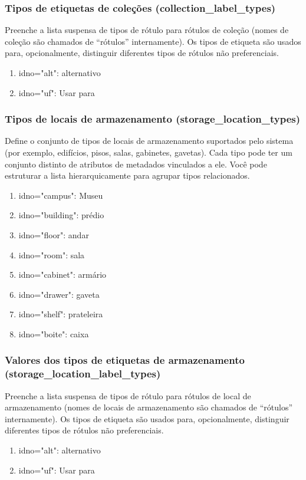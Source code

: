 \subsubsection{Tipos de etiquetas de coleções (collection\_label\_types)}
Preenche a lista suspensa de tipos de rótulo para rótulos de coleção (nomes de coleção são chamados de ``rótulos'' internamente). Os tipos de etiqueta são usados para, opcionalmente, distinguir diferentes tipos de rótulos não preferenciais.
\begin{enumerate}
	\item idno="alt": alternativo
	\item idno="uf": Usar para
\end{enumerate}

\subsubsection{Tipos de locais de armazenamento (storage\_location\_types)}
Define o conjunto de tipos de locais de armazenamento suportados pelo sistema (por exemplo, edifícios, pisos, salas, gabinetes, gavetas). Cada tipo pode ter um conjunto distinto de atributos de metadados vinculados a ele. Você pode estruturar a lista hierarquicamente para agrupar tipos relacionados.
\begin{enumerate}
	\item idno="campus": Museu
	\item idno="building": prédio
	\item idno="floor": andar
	\item idno="room": sala
	\item idno="cabinet": armário
	\item idno="drawer": gaveta
	\item idno="shelf": prateleira
	\item idno="boite": caixa
\end{enumerate}

\subsubsection{Valores dos tipos de etiquetas de armazenamento (storage\_location\_label\_types)}
Preenche a lista suspensa de tipos de rótulo para rótulos de local de armazenamento (nomes de locais de armazenamento são chamados de ``rótulos'' internamente). Os tipos de etiqueta são usados para, opcionalmente, distinguir diferentes tipos de rótulos não preferenciais.

\begin{enumerate}
	\item idno="alt": alternativo
	\item idno="uf": Usar para
\end{enumerate}

